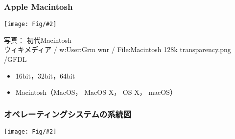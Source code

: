 \documentclass[dvipdfmx]{beamer}
\newcommand{\fig}[2]{\begin{center}\texttt{[image: Fig/\#2]}\end{center}}
\begin{document}
\begin{frame}
  \frametitle{Apple Macintosh}
  \fig{scale=0.2}{Macintosh_128k_transparency.png}
      {\tiny
        \begin{center}
          写真： 初代Macintosh \\
          ウィキメディア / w:User:Grm wnr / 
          File:Macintosh 128k transparency.png /GFDL
        \end{center}
      }
  \begin{itemize}
    \item 16bit，32bit，64bit
    \item Macintosh（MacOS， MacOS X， OS X， macOS）
  \end{itemize}
\end{frame}

\begin{frame}
  \frametitle{オペレーティングシステムの系統図}
  \fig{scale=0.33}{tree-crop.pdf}
\end{frame}
\end{document}
